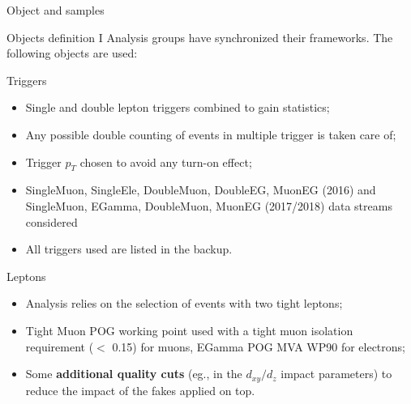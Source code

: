 \documentclass[8pt]{beamer}
\begin{document}
\begin{frame}[standout]
Object and samples
\end{frame}

%

\begin{frame}{Objects definition I}
\justifying
Analysis groups have synchronized their frameworks. The following objects are used: \vfill

\vspace{5pt} \begin{block}{\centering Triggers}\end{block} \vspace{-6pt}
\begin{itemize}
\justifying
\item \alert{Single and double lepton triggers} combined to gain statistics;
\item Any possible double counting of events in multiple trigger is taken care of;
\item Trigger $p_T$ chosen to avoid any turn-on effect;
\item SingleMuon, SingleEle, DoubleMuon, DoubleEG, MuonEG (2016) and SingleMuon, EGamma, DoubleMuon, MuonEG (2017/2018) data streams considered
\item All triggers used are listed in the backup.
\end{itemize} \vfill

\begin{block}{\centering Leptons}\end{block} \vspace{-6pt}
\begin{itemize}
\justifying
\item Analysis relies on the selection of events with two tight leptons;
\item \alert{Tight Muon POG} working point used with a tight muon isolation requirement ($<$ 0.15) for muons, EGamma POG \alert{MVA WP90} for electrons;
\item Some \textbf{additional quality cuts} (eg., in the $d_{xy}/d_z$ impact parameters) to reduce the impact of the fakes applied on top.
\end{itemize} \vfill
\end{frame}
\end{document}
